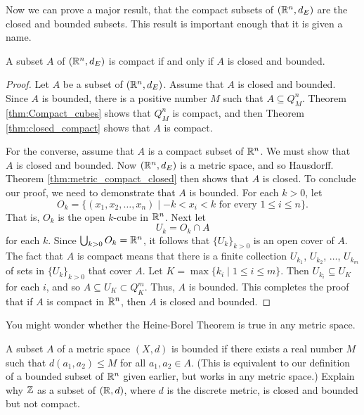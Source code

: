 Now we can prove a major result, that the compact subsets of $(\mathbb{R}^n, d_E)$ are the closed and bounded subsets. This result is important enough that it is given a name. 

\begin{theorem} A subset $A$ of $(\mathbb{R}^n, d_E)$ is compact if and only if $A$ is closed and bounded. 
\end{theorem}

\begin{proof} Let $A$ be a subset of $(\mathbb{R}^n, d_E)$. Assume that $A$ is closed and bounded. Since $A$ is bounded, there is a positive number $M$ such that $A \subseteq Q^n_M$. Theorem \ref{thm:Compact_cubes} shows that $ Q^n_M$ is compact, and then Theorem \ref{thm:closed_compact} shows that $A$ is compact. 

For the converse, assume that $A$ is a compact subset of $\mathbb{R}^n$. We must show that $A$ is closed and bounded. Now $(\mathbb{R}^n, d_E)$ is a metric space, and so Hausdorff. Theorem \ref{thm:metric_compact_closed} then shows that $A$ is closed. To conclude our proof, we need to demonstrate that $A$ is bounded. For each $k > 0$, let 
\[O_k = \{ (x_1,x_2, \ldots, x_n) \mid -k < x_i < k \text{ for every } 1 \leq i \leq n\}.\]
That is, $O_k$ is the open $k$-cube in $\mathbb{R}^n$. Next let 
\[U_k = O_k \cap A\]
for each $k$. Since $\bigcup_{k > 0} O_k = \mathbb{R}^n$, it follows that $\{U_k\}_{k > 0}$ is an open cover of $A$. The fact that $A$ is compact means that there is a finite collection $U_{k_1}$, $U_{k_2}$, $\ldots$, $U_{k_m}$ of sets in $\{U_k\}_{k > 0}$ that cover $A$. Let $K = \max\{k_i \mid 1 \leq i \leq m\}$. Then $U_{k_i} \subseteq U_K$ for each $i$, and so $A \subseteq U_K \subset Q^m_K$. Thus, $A$ is bounded. This completes the proof that if $A$ is compact in $\mathbb{R}^n$, then $A$ is closed and bounded. 
\end{proof}

You might wonder whether the Heine-Borel Theorem is true in any metric space.

\begin{activity} A subset $A$ of a metric space $(X, d)$ is bounded if there exists a real number $M$ such that $d(a_1,a_2) \leq M$ for all $a_1, a_2 \in A$. (This is equivalent to our definition of a bounded subset of $\mathbb{R}^n$ given earlier, but works in any metric space.) Explain why $\mathbb{Z}$ as a subset of $(\mathbb{R},d)$, where $d$ is the discrete metric, is closed and bounded but not compact.  

\end{activity}

